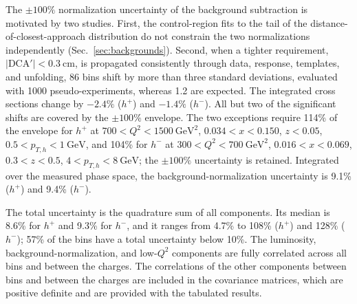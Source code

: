 \documentclass[11pt,a4paper]{article}
\newcommand{\Qsq}{Q^{2}}
\newcommand{\pTh}{p_{T,h}}
\newcommand{\hplus}{h^{+}}
\newcommand{\hminus}{h^{-}}
\newcommand{\GeV}{\mathrm{GeV}}
\newcommand{\GeVsq}{\mathrm{GeV}^{2}}
\begin{document}
The $\pm100\%$ normalization uncertainty of the background subtraction is motivated by two studies. First, the control-region fits to the tail of the distance-of-closest-approach distribution do not constrain the two normalizations independently (Sec.~\ref{sec:backgrounds}). Second, when a tighter requirement, $|\mathrm{DCA}'|<0.3~\mathrm{cm}$, is propagated consistently through data, response, templates, and unfolding, 86 bins shift by more than three standard deviations, evaluated with 1000 pseudo-experiments, whereas 1.2 are expected. The integrated cross sections change by $-2.4\%$ ($\hplus$) and $-1.4\%$ ($\hminus$). All but two of the significant shifts are covered by the $\pm100\%$ envelope. The two exceptions require 114\% of the envelope for $\hplus$ at $700<\Qsq<1500~\GeVsq$, $0.034<x<0.150$, $z<0.05$, $0.5<\pTh<1~\GeV$, and 104\% for $\hminus$ at $300<\Qsq<700~\GeVsq$, $0.016<x<0.069$, $0.3<z<0.5$, $4<\pTh<8~\GeV$; the $\pm100\%$ uncertainty is retained. Integrated over the measured phase space, the background-normalization uncertainty is 9.1\% ($\hplus$) and 9.4\% ($\hminus$).

The total uncertainty is the quadrature sum of all components. Its median is 8.6\% for $\hplus$ and 9.3\% for $\hminus$, and it ranges from 4.7\% to 108\% ($\hplus$) and 128\% ($\hminus$); 57\% of the bins have a total uncertainty below 10\%. The luminosity, background-normalization, and low-$\Qsq$ components are fully correlated across all bins and between the charges. The correlations of the other components between bins and between the charges are included in the covariance matrices, which are positive definite and are provided with the tabulated results.
\end{document}
